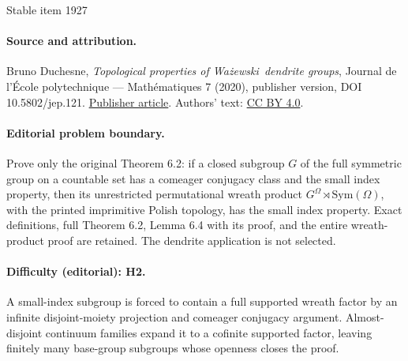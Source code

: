 \documentclass[11pt]{article}
\begin{document}
\begin{center}{\Large Stable item 1927}\end{center}
\paragraph{Source and attribution.}
Bruno Duchesne, \emph{Topological properties of Ważewski dendrite groups}, Journal de l’École polytechnique — Mathématiques 7 (2020), publisher version, DOI 10.5802/jep.121. \href{https://jep.centre-mersenne.org/articles/10.5802/jep.121/}{Publisher article}. Authors' text: \href{https://creativecommons.org/licenses/by/4.0/}{CC BY 4.0}.
\paragraph{Editorial problem boundary.}
Prove only the original Theorem 6.2: if a closed subgroup \(G\) of the full symmetric group on a countable set has a comeager conjugacy class and the small index property, then its unrestricted permutational wreath product \(G^\Omega\rtimes\mathrm{Sym}(\Omega)\), with the printed imprimitive Polish topology, has the small index property. Exact definitions, full Theorem 6.2, Lemma 6.4 with its proof, and the entire wreath-product proof are retained. The dendrite application is not selected.
\paragraph{Difficulty (editorial): H2.}
A small-index subgroup is forced to contain a full supported wreath factor by an infinite disjoint-moiety projection and comeager conjugacy argument. Almost-disjoint continuum families expand it to a cofinite supported factor, leaving finitely many base-group subgroups whose openness closes the proof.
\end{document}
